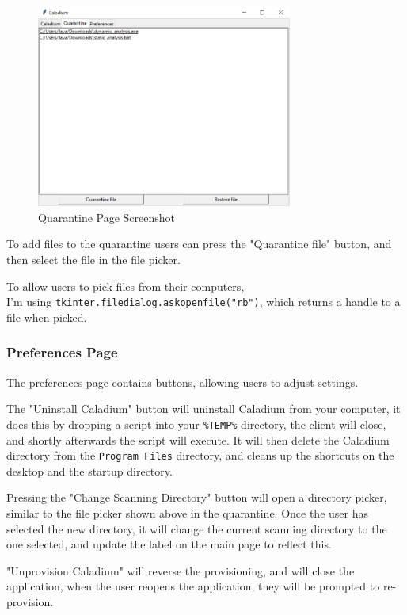 \begin{figure}[h!]
    \centering
    \label{image:quarantinePageScreenshot}
    \includegraphics[width=0.75\textwidth]{../docs/client.png}
    \caption{Quarantine Page Screenshot}
\end{figure}

To add files to the quarantine users can press the "Quarantine file" button,
and then select the file in the file picker.

To allow users to pick files from their computers, \\
I'm using \texttt{tkinter.filedialog.askopenfile("rb")},
which returns a handle to a file when picked.

\subsubsection{Preferences Page}
The preferences page contains buttons, allowing users to adjust settings.

The "Uninstall Caladium" button will uninstall Caladium from your computer,
it does this by dropping a script into your \texttt{\%TEMP\%} directory,
the client will close, and shortly afterwards the script will execute.
It will then delete the Caladium directory from the \texttt{Program Files} directory,
and cleans up the shortcuts on the desktop and the startup directory.

Pressing the "Change Scanning Directory" button will open a directory picker,
similar to the file picker shown above in the quarantine.
Once the user has selected the new directory,
it will change the current scanning directory to the one selected,
and update the label on the main page to reflect this.

"Unprovision Caladium" will reverse the provisioning,
and will close the application, when the user reopens
the application, they will be prompted to re-provision.

